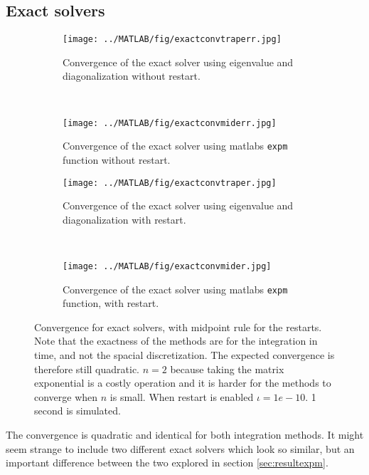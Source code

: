 \subsection{Exact solvers} %
\begin{figure}[H]
        \centering
        \begin{subfigure}[b]{0.30\textwidth}
                \texttt{[image: ../MATLAB/fig/exactconvtraperr.jpg]}
                \caption{ Convergence of the exact solver using eigenvalue and diagonalization without restart. }
                \label{fig:exactconvtraperr}
        \end{subfigure}
        ~
        \begin{subfigure}[b]{0.30\textwidth}
                \texttt{[image: ../MATLAB/fig/exactconvmiderr.jpg]}
                \caption{ Convergence of the exact solver using matlabs \texttt{expm} function without restart. }  
				\label{fig:exactconvmiderr}
        \end{subfigure}         
        
        \begin{subfigure}[b]{0.30\textwidth}
                \texttt{[image: ../MATLAB/fig/exactconvtraper.jpg]}
                \caption{ Convergence of the exact solver using eigenvalue and diagonalization with restart.}
                \label{fig:exactconvtraper}
        \end{subfigure}
        ~
        \begin{subfigure}[b]{0.30\textwidth}
                \texttt{[image: ../MATLAB/fig/exactconvmider.jpg]}
                \caption{ Convergence of the exact solver using matlabs \texttt{expm} function, with restart. }
                \label{fig:exactconvmider}
        \end{subfigure}
       
\caption{Convergence for exact solvers, with midpoint rule for the restarts. Note that the exactness of the methods are for the integration in time, and not the spacial discretization. The expected convergence is therefore still quadratic. $n = 2$ because taking the matrix exponential is a costly operation and it is harder for the methods to converge when $n$ is small. When restart is enabled $\iota = 1e-10$. 1 second is simulated. }
\label{fig:intexactt}
\end{figure}
The convergence is quadratic and identical for both integration methods. It might seem strange to include two different exact solvers which look so similar, but an important difference between the two explored in section \ref{sec:resultexpm}.

